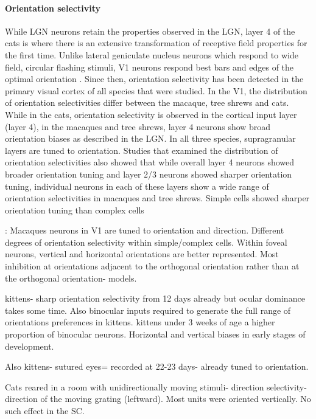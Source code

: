\paragraph{Orientation selectivity}

While LGN neurons retain the properties observed in the LGN, layer 4 of the cats is where there is an extensive transformation of receptive field properties for the first time. Unlike lateral geniculate nucleus neurons which respond to wide field, circular flashing stimuli, V1 neurons respond best bars and edges of the optimal orientation \cite{Hubel1962d}. Since then, orientation selectivity has been detected in the primary visual cortex of all species that were studied. In the V1, the distribution of orientation selectivities differ between the macaque, tree shrews and cats. While in the cats, orientation selectivity is observed in the cortical input layer (layer 4), in the macaques and tree shrews, layer 4 neurons show broad orientation biases as described in the LGN. In all three species, supragranular layers are tuned to orientation. Studies that examined the distribution of orientation selectivities also showed that while overall layer 4 neurons showed broader orientation tuning and layer 2/3 neurons showed sharper orientation tuning, individual neurons in each of these layers show a wide range of orientation selectivities in macaques and tree shrews. Simple cells showed sharper orientation tuning than complex cells \cite{Henry1974, DeValois1982, Leventhal1978}


\cite{DeValois1982}: Macaques neurons in V1 are tuned to orientation and direction. Different degrees of orientation selectivity within simple/complex cells. Within foveal neurons, vertical and horizontal orientations are better represented. Most inhibition at orientations adjacent to the orthogonal orientation rather than at the orthogonal orientation- models.

\cite{Fregnac1978} kittens- sharp orientation selectivity from 12 days already but ocular dominance takes some time. Also binocular inputs required to generate the full range of orientations preferences in kittens. kittens under 3 weeks of age a higher proportion of binocular neurons. Horizontal and vertical biases in early stages of development.

\cite{Sherk1975} Also kittens- sutured eyes= recorded at 22-23 days- already tuned to orientation. 

\cite{Cynader1975} Cats reared in a room with unidirectionally moving stimuli- direction selectivity- direction of the moving grating (leftward). Most units were oriented vertically. No such effect in the SC. 

